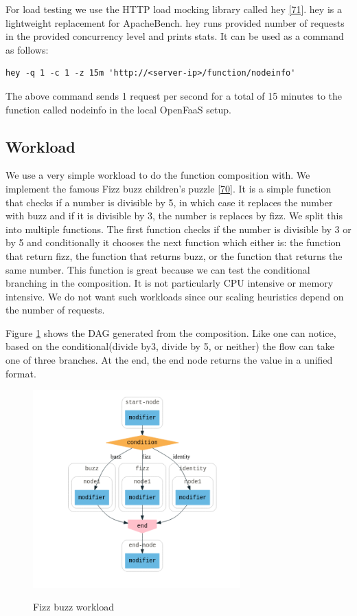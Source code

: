 \documentclass[12pt,titlepage]{article}
\begin{document}
For load testing we use the HTTP load mocking library called hey \hyperref[ref:71]{[71}]. hey is a
lightweight replacement for ApacheBench. hey runs provided number of requests in
the provided concurrency level and prints stats. It can be used as a command as
follows:
\begin{lstlisting}
hey -q 1 -c 1 -z 15m 'http://<server-ip>/function/nodeinfo'
\end{lstlisting}
The above command sends 1 request per second for a total of 15 minutes to the
function called nodeinfo in the local OpenFaaS setup.

\subsection{Workload}
\label{sec:orgd5fdc8a}
We use a very simple workload to do the function composition with. We implement
the famous Fizz buzz children's puzzle \hyperref[ref:70]{[70}]. It is a simple function that checks
if a number is divisible by 5, in which case it replaces the number with buzz
and if it is divisible by 3, the number is replaces by fizz. We split this into
multiple functions. The first function checks if the number is divisible by 3 or
by 5 and conditionally it chooses the next function which either is: the
function that return fizz, the function that returns buzz, or the function that
returns the same number. This function is great because we can test the
conditional branching in the composition. It is not particularly CPU intensive
or memory intensive. We do not want such workloads since our scaling heuristics
depend on the number of requests.

Figure \ref{fig:fizz_buzz} shows the DAG generated from the composition. Like
one can notice, based on the conditional(divide by3, divide by 5, or neither)
the flow can take one of three branches. At the end, the end node returns the
value in a unified format.

\begin{figure}[!h]
    \caption{Fizz buzz workload}
    \centering
    \includegraphics[width=80mm]{./thesis_images/fizz_buzz.png}
    \label{fig:fizz_buzz}
\end{figure}
\end{document}
